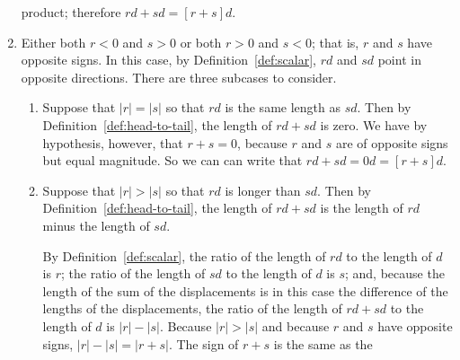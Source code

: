 \begin{exercise}
\begin{solution}
\begin{enumerate}
            product; therefore $r d + s d = [r + s] d$.
         \item Either both $r < 0$ and $s > 0$ or both $r > 0$ and $s < 0$;
            that is, $r$ and $s$ have opposite signs. In this case, by
            Definition~\ref{def:scalar}, $r d$ and $s d$ point in opposite
            directions. There are three subcases to consider.
            \begin{enumerate}
               \item Suppose that $|r| = |s|$ so that $r d$ is the same length
                  as $s d$. Then by Definition~\ref{def:head-to-tail}, the
                  length of $r d + s d$ is zero. We have by hypothesis,
                  however, that $r + s = 0$, because $r$ and $s$ are of
                  opposite signs but equal magnitude. So we can can write that
                  $r d + s d = 0 d = [r + s] d$.
               \item Suppose that $|r| > |s|$ so that $r d$ is longer than $s
                  d$. Then by Definition~\ref{def:head-to-tail}, the length of
                  $r d + s d$ is the length of $r d$ minus the length of $s d$.
                  \begin{center}
                  \end{center}
                  By Definition~\ref{def:scalar}, the ratio of the length of $r
                  d$ to the length of $d$ is $r$; the ratio of the length of $s
                  d$ to the length of $d$ is $s$; and, because the length of
                  the sum of the displacements is in this case the difference
                  of the lengths of the displacements, the ratio of the length
                  of $r d + s d$ to the length of $d$ is $|r| - |s|$. Because
                  $|r| > |s|$ and because $r$ and $s$ have opposite signs, $|r|
                  - |s| = |r + s|$.  The sign of $r + s$ is the same as the

\end{enumerate}
\end{enumerate}
\end{solution}
\end{exercise}
